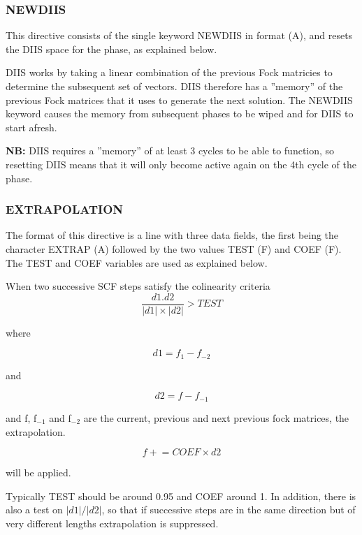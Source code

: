 \documentclass[11pt,fleqn]{article}
\begin{document}
\subsubsection[NEWDIIS]{NEWDIIS}
This directive consists of the single keyword NEWDIIS in format (A),
and resets the DIIS space for the phase, as explained below.

DIIS works by taking a linear combination of the previous Fock
matricies to determine the subsequent set of vectors. DIIS therefore
has a ''memory'' of the previous Fock matrices that it uses to
generate the next solution. The NEWDIIS keyword causes the memory from
subsequent phases to be wiped and for DIIS to start afresh.

\textbf{NB:} DIIS requires a ''memory'' of at least 3 cycles to be able to
function, so resetting DIIS means that it will only become active
again on the 4th cycle of the phase.

\subsubsection[EXTRAPOLATION]{EXTRAPOLATION}
The format of this directive is a line with three data fields, the
first being the character EXTRAP (A) followed by the two values TEST (F)
and COEF (F). The TEST and COEF variables are used as explained below.

When two successive SCF steps satisfy the colinearity criteria
\begin{equation}
          \frac {d1.d2}{ |d1| \times |d2| } > TEST
\end{equation}

where

\begin{equation}
          d1 = f_{1} - f_{-2}
\end{equation}

and

\begin{equation}
          d2 = f - f_{-1}
\end{equation}

and f, f$_{-1}$ and f$_{-2}$ are the current, previous and next previous
fock matrices, the extrapolation.

\begin{equation}
f +\!= COEF \times d2
\end{equation}

will be applied.

Typically TEST should be around 0.95 and COEF around
1. In addition, there is also a test on $|d1| / |d2|$, so that if
successive steps are in the same direction but of very different
lengths extrapolation is suppressed.
\end{document}
